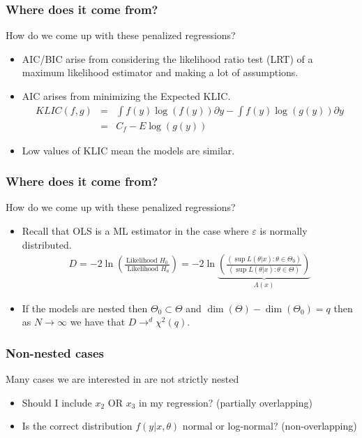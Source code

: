 \begin{frame}
    \frametitle{Where does it come from?}
    How do we come up with these penalized regressions?
    \begin{itemize}
    \item AIC/BIC arise from considering the likelihood ratio test (LRT) of a maximum likelihood estimator and making a lot of assumptions.
    \item AIC arises from minimizing the Expected KLIC.
    \begin{eqnarray*}
    KLIC(f,g) &=& \int  f(y) \log(f(y)) \partial y - \int  f(y) \log(g(y)) \partial y  \\
    &=& C_f - E  \log(g(y))
    \end{eqnarray*}
    \item Low values of KLIC mean the models are similar.
    \end{itemize}
\end{frame}
    
\begin{frame}
    \frametitle{Where does it come from?}
    How do we come up with these penalized regressions?
    \begin{itemize}
    \item Recall that OLS is a ML estimator in the case where $\varepsilon$ is normally distributed.
    \begin{eqnarray*}
    D = - 2 \ln \left (\frac{\mbox{Likelihood  } H_0}{\mbox{ Likelihood  }H_a} \right) = -2 \ln \underbrace{\left(\frac{(\sup L(\theta | x) : \theta \in \Theta_0)}{(\sup L(\theta | x) : \theta \in \Theta)}\right)}_{\Lambda(x)}
    \end{eqnarray*}
    \item If the models are \alert{nested} then $\Theta_0 \subset \Theta$ and $\dim(\Theta) -\dim(\Theta_0) = q$ then as $N\rightarrow \infty$ we have that $D \rightarrow^d \chi^2(q)$.
    \end{itemize}
\end{frame}
    

\begin{frame}
\frametitle{Non-nested cases}
Many cases we are interested in are \alert{not strictly nested}
\begin{itemize}
\item Should I include $x_2$ OR $x_3$ in my regression? (partially overlapping)
\item Is the correct distribution $f(y | x, \theta)$ normal or log-normal? (non-overlapping)
\end{itemize}
\end{frame}

